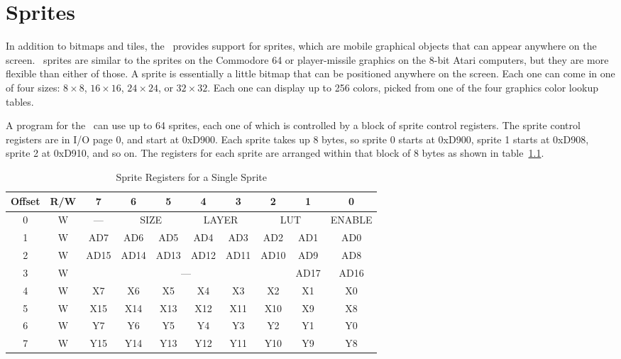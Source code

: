 \chapter{Sprites}

In addition to bitmaps and tiles, the \jr\ provides support for sprites, which are mobile graphical objects that can appear anywhere on the screen. \jr\ sprites are similar to the sprites on the Commodore 64 or player-missile graphics on the 8-bit Atari computers, but they are more flexible than either of those. A sprite is essentially a little bitmap that can be positioned anywhere on the screen. Each one can come in one of four sizes: $8 \times 8$, $16 \times 16$, $24 \times 24$, or $32 \times 32$. Each one can display up to 256 colors, picked from one of the four graphics color lookup tables.

A program for the \jr\ can use up to 64 sprites, each one of which is controlled by a block of sprite control registers. The sprite control registers are in I/O page 0, and start at 0xD900. Each sprite takes up 8 bytes, so sprite 0 starts at 0xD900, sprite 1 starts at 0xD908, sprite 2 at 0xD910, and so on. The registers for each sprite are arranged within that block of 8 bytes as shown in table~\ref{tab:sp_reg}.

\begin{table}[ht]
    \begin{center}
        \begin{tabular}{|c|c|c|c|c|c|c|c|c|c|} \hline
            Offset & R/W & 7 & 6 & 5 & 4 & 3 & 2 & 1 & 0 \\ \hline\hline
            0 & W & --- & \multicolumn{2}{|c|}{SIZE} & \multicolumn{2}{|c|}{LAYER} & \multicolumn{2}{|c|}{LUT} & ENABLE \\ \hline
            1 & W & AD7 & AD6 & AD5 & AD4 & AD3 & AD2 & AD1 & AD0 \\ \hline
            2 & W & AD15 & AD14 & AD13 & AD12 & AD11 & AD10 & AD9 & AD8 \\ \hline
            3 & W & \multicolumn{6}{|c|}{---} & AD17 & AD16 \\ \hline
            4 & W & X7 & X6 & X5 & X4 & X3 & X2 & X1 & X0 \\ \hline
            5 & W & X15 & X14 & X13 & X12 & X11 & X10 & X9 & X8 \\ \hline
            6 & W & Y7 & Y6 & Y5 & Y4 & Y3 & Y2 & Y1 & Y0 \\ \hline
            7 & W & Y15 & Y14 & Y13 & Y12 & Y11 & Y10 & Y9 & Y8 \\ \hline
        \end{tabular}
    \end{center}
    \caption{Sprite Registers for a Single Sprite}
    \label{tab:sp_reg}
\end{table}

